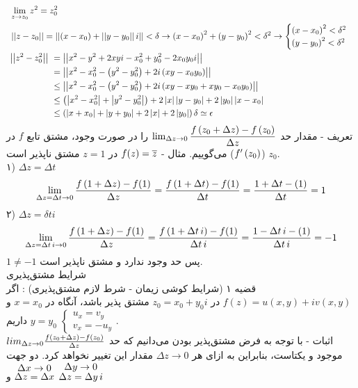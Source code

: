 \[\begin{aligned}
	&\
	\lim_{z\to z_0}z^2=z_0^2
	\\ &\
	\norm{z-z_0}=\norm{\pr{x-x_0}+\norm{y-y_0}i}<\delta\rightarrow
	\pr{x-x_0}^2+\pr{y-y_0}^2<\delta^2\rightarrow \begin{cases}
		\pr{x-x_0}^2<\delta^2\\ \pr{y-y_0}^2<\delta^2
	\end{cases}
	\\ &\
	\begin{aligned}
		\norm{z^2-z_0^2} &\ =
		\norm{x^2-y^2+2xyi-x_0^2+y_0^2-2x_0y_0i}
		\\ &\
		=\norm{x^2-x_0^2-\pr{y^2-y_0^2}+2i\pr{xy-x_0y_0}}
		\\ &\
		\le\norm{x^2-x_0^2-\pr{y^2-y_0^2}+2i\pr{xy-xy_0+xy_0-x_0y_0}}
		\\ &\
		\le\pr{\abs{x^2-x_0^2}+\abs{y^2-y_0^2}}+2\abs{x}\abs{y-y_0}+2\abs{y_0}\abs{x-x_0}
		\\ &\
		\le\pr{\abs{x+x_0}+\abs{y+y_0}+2\abs{x}+2\abs{y_0}}\delta\simeq\epsilon
	\end{aligned}
\end{aligned}\]
تعریف - مقدار حد
$\lim_{\Delta z\to0}\dfrac{f\pr{z_0+\Delta z}-f\pr{z_0}}{\Delta z}$
را در صورت وجود، مشتق تابع
$f$
در
$z_0$
($f^\prime\pr{z_0}$)
می‌گوییم.
مثال -
$f(z)=\ol{z}$
در
$z=1$
مشتق نا‌پذیر است.\\
۱) $\Delta z=\Delta t$
\[
\lim_{\Delta z=\Delta t\to0} \frac{f\pr{1+\Delta z}-f(1)}{\Delta z}=
\frac{f\pr{1+\Delta t}-f(1)}{\Delta t}=
\frac{{1+\Delta t}-(1)}{\Delta t}=1
\]
۲)
$\Delta z=\delta t i$
\[
\lim_{\Delta z=\Delta t \,i\to0} \frac{f\pr{1+\Delta z}-f(1)}{\Delta z}=
\frac{f\pr{1+\Delta t\, i}-f(1)}{\Delta t\, i}=
\frac{{1-\Delta t\, i}-(1)}{\Delta t \, i}=-1
\]
$1\ne -1$
پس حد وجود ندارد و مشتق نا‌پذیر است.\\
شرایط مشتق‌پذیری\\
قضیه ۱ (شرایط کوشی زیمان - شرط لازم مشتق‌پذیری) : اگر
$f(z)=u(x,y)+iv(x,y)$
در
$z_0=x_0+y_0i$
مشتق پذیر باشد، آنگاه در
$x=x_0$
و
$y=y_0$
داریم
$\begin{cases}
	u_x=v_y\\
	v_x=-u_y
\end{cases}$.
\\
اثبات - با توجه به فرض مشتق‌پذیر بودن می‌دانیم که حد
$lim_{\Delta z\to0}\frac{f\pr{z_0+\Delta z}-f\pr{z_0}}{\Delta z}$
موجود و یکتاست، بنابراین به ازای هر
$\Delta z\to0$
مقدار این تغییر نخواهد کرد. دو جهت
$\myover{\Delta z=\Delta x}{\Delta x\to0}$
و
$\myover{\Delta z=\Delta y\, i}{\Delta y\to0}$
